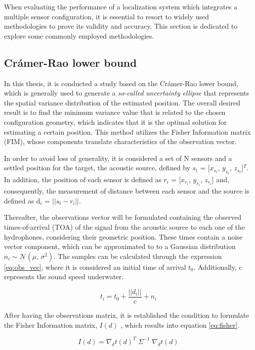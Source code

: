 When evaluating the performance of a localization system which integrates a multiple sensor configuration, it is essential to resort to widely used methodologies to prove its validity and accuracy. This section is dedicated to explore some commonly employed methodologies.

\subsection{Crámer-Rao lower bound}	\label{sec:cramer}

In this thesis, it is conducted a study based on the Crámer-Rao lower bound, which is generally used to generate a \textit{so-called uncertainty ellipse} \cite{bishop-cramer-rao} that represents the spatial variance distribution of the estimated position. The overall desired result is to find the minimum variance value that is related to the chosen configuration geometry, which indicates that it is the optimal solution for estimating a certain position. This method utilizes the Fisher Information matrix (FIM), whose components translate characteristics of the observation vector.

In order to avoid loss of generality, it is considered a set of N sensors and a settled position for the target, the acoustic source, defined by $s_{t}$ = [$x_{s_{t}}$, $y_{s_{t}}$, $z_{s_{t}}$]$^T$. In addition, the position of each sensor is defined as $r_{i}$ = [$x_{r_{i}}$, $y_{r_{i}}$, $z_{r_{i}}$] and, consequently, the measurement of distance between each sensor and the source is defined as d$_{i}$ = $|| s_{t} - r_{i} ||$.

Thereafter, the observations vector will be formulated containing the observed times-of-arrival (TOA) of the signal from the acoustic source to each one of the hydrophones, considering their geometric position. These times contain a noise vector component, which can be approximated to to a Gaussian distribution $n_i \sim \mathcal{N}(\mu,\,\sigma^{2})$. The samples can be calculated through the expression \ref{eq:obs_vec}, where it is considered an initial time of arrival $t_0$. Additionally, c represents the sound speed underwater.

{\large\[
	t_i = t_0 + \frac{||d_i||}{c} + n_i
	\label{eq:obs_vec}
	\]}

After having the observations matrix, it is established the condition to formulate the Fisher Information matrix, $I(d)$ , which results into equation \ref{eq:fisher}.

{\large\[
	I(d) = \nabla_{d}t(d)^T \; \Sigma^{-1} \; \nabla_{d}t(d)
	\label{eq:fisher}
	\]}

